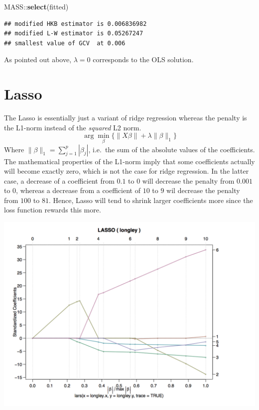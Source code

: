 \documentclass[]{book}
\newenvironment{Shaded}{\begin{snugshade}}{\end{snugshade}}
\newcommand{\KeywordTok}[1]{\textcolor[rgb]{0.13,0.29,0.53}{\textbf{{#1}}}}
\newcommand{\NormalTok}[1]{{#1}}
\begin{document}
\begin{Shaded}
\begin{Highlighting}[]
\NormalTok{MASS::}\KeywordTok{select}\NormalTok{(fitted)}
\end{Highlighting}
\end{Shaded}

\begin{verbatim}
## modified HKB estimator is 0.006836982 
## modified L-W estimator is 0.05267247 
## smallest value of GCV  at 0.006
\end{verbatim}

As pointed out above, \(\lambda = 0\) corresponds to the OLS solution.

\section{Lasso}\label{lasso}

The Lasso is essentially just a variant of ridge regression whereas the
penalty is the L1-norm instead of the \emph{squared} L2 norm.
\[\arg\min\limits_{\beta} \{ \|X \beta \|+ \lambda \| \beta \|_1 \}\]
Where \(\| \beta \|_1 = \sum\limits_{j = 1}^p|\beta_j|\), i.e.~the sum
of the absolute values of the coefficients. The mathematical properties
of the L1-norm imply that some coefficients actually will become exactly
zero, which is not the case for ridge regression. In the latter case, a
decrease of a coefficient from \(0.1\) to \(0\) will decrease the
penalty from \(0.001\) to \(0\), whereas a decrease from a coefficient
of \(10\) to \(9\) wil decrease the penalty from \(100\) to \(81\).
Hence, Lasso will tend to shrink larger coefficients more since the loss
function rewards this more.

\includegraphics[width=16.1in]{figures/lasso_trace}
\end{document}
